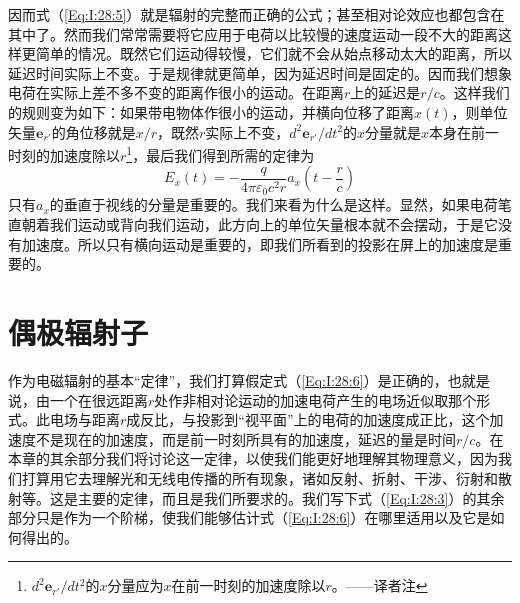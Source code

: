 因而式（\ref{Eq:I:28:5}）就是辐射的完整而正确的公式；甚至相对论效应也都包含在其中了。然而我们常常需要将它应用于电荷以比较慢的速度运动一段不大的距离这样更简单的情况。既然它们运动得较慢，它们就不会从始点移动太大的距离，所以延迟时间实际上不变。于是规律就更简单，因为延迟时间是固定的。因而我们想象电荷在实际上差不多不变的距离作很小的运动。在距离$r$上的延迟是$r/c$。这样我们的规则变为如下：如果带电物体作很小的运动，并横向位移了距离$x(t)$，则单位矢量$\boldsymbol{e}_{r'}$的角位移就是$x/r$，既然$r$实际上不变，$d^2\boldsymbol{e}_{r'}/dt^2$的$x$分量就是$x$本身在前一时刻的加速度除以$r$\footnote{$d^2\boldsymbol{e}_{r'}/dt^2$的$x$分量应为$x$在前一时刻的加速度除以$r$。——译者注}，最后我们得到所需的定律为
\begin{equation}
    \label{Eq:I:28:6}
    E_x(t) = -\frac{q}{4\pi\varepsilon_0c^2r} a_x\left ( t-\frac{r}{c} \right )
\end{equation}
只有$a_x$的垂直于视线的分量是重要的。我们来看为什么是这样。显然，如果电荷笔直朝着我们运动或背向我们运动，此方向上的单位矢量根本就不会摆动，于是它没有加速度。所以只有横向运动是重要的，即我们所看到的投影在屏上的加速度是重要的。

\section{偶极辐射子}

作为电磁辐射的基本“定律”，我们打算假定式（\ref{Eq:I:28:6}）是正确的，也就是说，由一个在很远距离$r$处作非相对论运动的加速电荷产生的电场近似取那个形式。此电场与距离$r$成反比，与投影到“视平面”上的电荷的加速度成正比，这个加速度不是现在的加速度，而是前一时刻所具有的加速度，延迟的量是时间$r/c$。在本章的其余部分我们将讨论这一定律，以使我们能更好地理解其物理意义，因为我们打算用它去理解光和无线电传播的所有现象，诸如反射、折射、干涉、衍射和散射等。这是主要的定律，而且是我们所要求的。我们写下式（\ref{Eq:I:28:3}）的其余部分只是作为一个阶梯，使我们能够估计式（\ref{Eq:I:28:6}）在哪里适用以及它是如何得出的。

